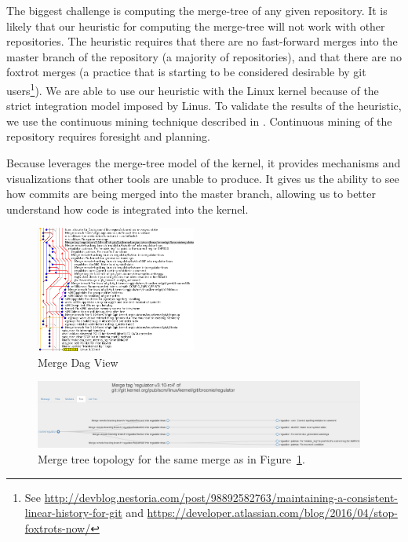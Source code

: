 \documentclass[conference, draftclsnofoot, draft]{IEEEtran}
\begin{document}
The biggest challenge is computing the merge-tree of any given repository. It
is likely that our heuristic for computing the merge-tree will not work with other
repositories. The heuristic requires that there are no fast-forward merges into the
master branch of the repository (a majority of repositories), and that there are no
foxtrot merges (a practice that is starting to be considered desirable by git users\footnote{See
  \url{http://devblog.nestoria.com/post/98892582763/maintaining-a-consistent-linear-history-for-git} and
  \url{https://developer.atlassian.com/blog/2016/04/stop-foxtrots-now/}}).
We are able to use our heuristic with the Linux kernel because of
the strict integration model imposed by Linus. To validate the results of the
heuristic, we use the continuous mining technique described in \cite{German2015}.
Continuous mining of the repository requires foresight and planning.

Because \tool leverages the merge-tree model of the kernel, it provides mechanisms
and visualizations that other tools are unable to produce. It gives us the ability to
see how commits are being merged into the master branch, allowing us to better understand
how code is integrated into the kernel.

\begin{figure}
        \centering
        \includegraphics[width=0.47\textwidth]{figures/042dd_DAG.png}
        \caption{Merge Dag View}
        \label{fig:dag_view}
\end{figure}

\begin{figure}
        \centering
        \includegraphics[width=0.97\textwidth]{figures/042dd_tree.png}
        \caption{Merge tree topology for the same merge as in
                Figure~\ref{fig:dag_view}.}
        \label{fig:tree_view}
\end{figure}
\end{document}
